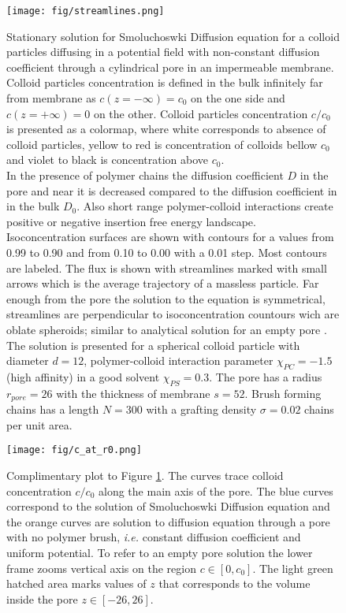 \documentclass[12pt, a4paper]{article}
\begin{document}
\begin{figure}
    \centering
    \texttt{[image: fig/streamlines.png]}
    \caption{
    Stationary solution for Smoluchoswki Diffusion equation for a colloid particles diffusing in a potential field with non-constant diffusion coefficient through a cylindrical pore in an impermeable membrane. Colloid particles concentration is defined in the bulk infinitely far from membrane as $c(z=-\infty) = c_0$ on the one side and $c(z=+\infty) = 0$ on the other. Colloid particles concentration $c/c_0$ is presented as a colormap, where white corresponds to absence of colloid particles, yellow to red is concentration of colloids bellow $c_0$ and violet to black is concentration above $c_0$.
    \\
    In the presence of polymer chains the diffusion coefficient $D$ in the pore and near it is decreased compared to the diffusion coefficient in in the bulk $D_0$. Also short range polymer-colloid interactions create positive or negative insertion free energy landscape.
    \\
    Isoconcentration surfaces are shown with contours for a values from 0.99 to 0.90 and from 0.10 to 0.00 with a 0.01 step. Most contours are labeled.
    The flux is shown with streamlines marked with small arrows which is the average trajectory of a massless particle. 
    Far enough from the pore the solution to the equation is symmetrical, streamlines are perpendicular to isoconcentration countours wich are oblate spheroids; similar to analytical solution for an empty pore \cite{Brunn, 1984}. 
    \\
    The solution is presented for a spherical colloid particle with diameter $d = 12$, polymer-colloid interaction parameter $\chi_{PC} = -1.5$ (high affinity) in a good solvent $\chi_{PS} = 0.3$. 
    The pore has a radius $r_{pore} = 26$ with the thickness of membrane $s = 52$.
    Brush forming chains has a length $N=300$ with a grafting density $\sigma = 0.02$ chains per unit area.
    }
    \label{fig:streamlines}
\end{figure}


\begin{figure}
    \centering
    \texttt{[image: fig/c\_at\_r0.png]}
    \caption{
    Complimentary plot to Figure \ref{fig:streamlines}. 
    The curves trace colloid concentration $c/c_0$ along the main axis of the pore. 
    The blue curves correspond to the solution of Smoluchoswki Diffusion equation and the orange curves are solution to diffusion equation through a pore with no polymer brush, \textit{i.e.} constant diffusion coefficient and uniform potential.
    To refer to an empty pore solution the lower frame zooms vertical axis on the region $c \in [0, c_0]$.
    The light green hatched area marks values of $z$ that corresponds to the volume inside the pore $z\in [-26, 26]$.
    }
    \label{fig:c_at_r0}
\end{figure}
\end{document}
